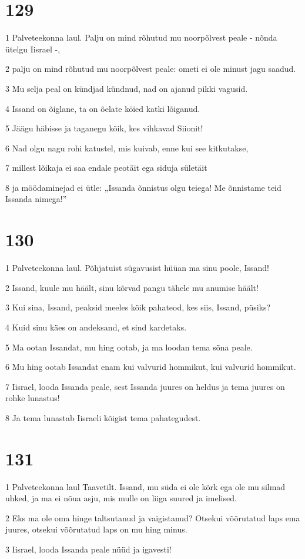 \chapter{129}

\par 1 Palveteekonna laul. Palju on mind rõhutud mu noorpõlvest peale - nõnda ütelgu Iisrael -,
\par 2 palju on mind rõhutud mu noorpõlvest peale: ometi ei ole minust jagu saadud.
\par 3 Mu selja peal on kündjad kündnud, nad on ajanud pikki vagusid.
\par 4 Issand on õiglane, ta on õelate köied katki lõiganud.
\par 5 Jäägu häbisse ja taganegu kõik, kes vihkavad Siionit!
\par 6 Nad olgu nagu rohi katustel, mis kuivab, enne kui see kitkutakse,
\par 7 millest lõikaja ei saa endale peotäit ega siduja sületäit
\par 8 ja möödaminejad ei ütle: „Issanda õnnistus olgu teiega! Me õnnistame teid Issanda nimega!”

\chapter{130}

\par 1 Palveteekonna laul. Põhjatuist sügavusist hüüan ma sinu poole, Issand!
\par 2 Issand, kuule mu häält, sinu kõrvad pangu tähele mu anumise häält!
\par 3 Kui sina, Issand, peaksid meeles kõik pahateod, kes siis, Issand, püsiks?
\par 4 Kuid sinu käes on andeksand, et sind kardetaks.
\par 5 Ma ootan Issandat, mu hing ootab, ja ma loodan tema sõna peale.
\par 6 Mu hing ootab Issandat enam kui valvurid hommikut, kui valvurid hommikut.
\par 7 Iisrael, looda Issanda peale, sest Issanda juures on heldus ja tema juures on rohke lunastus!
\par 8 Ja tema lunastab Iisraeli kõigist tema pahategudest.

\chapter{131}

\par 1 Palveteekonna laul Taavetilt. Issand, mu süda ei ole kõrk ega ole mu silmad uhked, ja ma ei nõua asju, mis mulle on liiga suured ja imelised.
\par 2 Eks ma ole oma hinge taltsutanud ja vaigistanud? Otsekui võõrutatud laps ema juures, otsekui võõrutatud laps on mu hing minus.
\par 3 Iisrael, looda Issanda peale nüüd ja igavesti!

